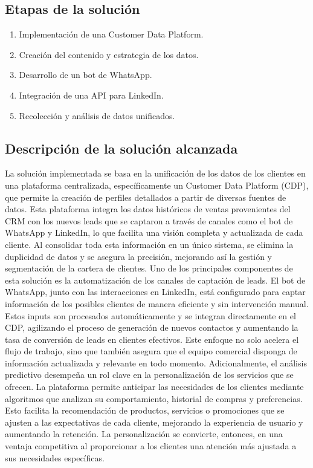 \documentclass[12pt]{article}
\begin{document}
\subsection{Etapas de la solución}
\begin{enumerate}
    \item Implementación de una Customer Data Platform.
    \item Creación del contenido y estrategia de los datos.
    \item Desarrollo de un bot de WhatsApp.
    \item Integración de una API para LinkedIn.
    \item Recolección y análisis de datos unificados.
\end{enumerate}

\subsection{Descripción de la solución alcanzada}
\noindent
La solución implementada se basa en la unificación de los datos de los clientes en una plataforma centralizada, específicamente un Customer Data Platform (CDP), que permite la creación de perfiles detallados a partir de diversas fuentes de datos. Esta plataforma integra los datos históricos de ventas provenientes del CRM con los nuevos leads que se captaron a través de canales como el bot de WhatsApp y LinkedIn, lo que facilita una visión completa y actualizada de cada cliente. Al consolidar toda esta información en un único sistema, se elimina la duplicidad de datos y se asegura la precisión, mejorando así la gestión y segmentación de la cartera de clientes.
Uno de los principales componentes de esta solución es la automatización de los canales de captación de leads. El bot de WhatsApp, junto con las interacciones en LinkedIn, está configurado para captar información de los posibles clientes de manera eficiente y sin intervención manual. Estos inputs son procesados automáticamente y se integran directamente en el CDP, agilizando el proceso de generación de nuevos contactos y aumentando la tasa de conversión de leads en clientes efectivos. Este enfoque no solo acelera el flujo de trabajo, sino que también asegura que el equipo comercial disponga de información actualizada y relevante en todo momento.
Adicionalmente, el análisis predictivo desempeña un rol clave en la personalización de los servicios que se ofrecen. La plataforma permite anticipar las necesidades de los clientes mediante algoritmos que analizan su comportamiento, historial de compras y preferencias. Esto facilita la recomendación de productos, servicios o promociones que se ajusten a las expectativas de cada cliente, mejorando la experiencia de usuario y aumentando la retención. La personalización se convierte, entonces, en una ventaja competitiva al proporcionar a los clientes una atención más ajustada a sus necesidades específicas.
\end{document}
